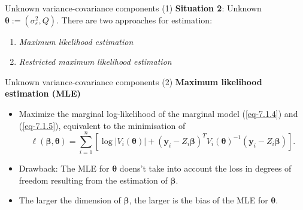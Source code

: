 \documentclass{beamer}
\newcommand{\boldbeta}{{\boldsymbol \beta}}
\newcommand{\boldtheta}{{\boldsymbol \theta}}
\newenvironment{wideitemize}%
  {\begin{itemize}%
    \setlength{\parskip}{1em}}%
  {\end{itemize}}
\begin{document}
\begin{frame}{Unknown variance-covariance components (1)}
\noindent \textbf{Situation 2}: Unknown  $\boldtheta:=(\sigma^2_\varepsilon, Q)$. There are two approaches for estimation:
\begin{enumerate}
\item \emph{Maximum likelihood estimation}
\item \emph{Restricted maximum likelihood estimation}
\end{enumerate}


 
\end{frame}


\begin{frame} {Unknown variance-covariance components (2)}
\noindent\textbf{Maximum likelihood estimation (MLE)}
\begin{wideitemize}
\item
Maximize the marginal log-likelihood of the marginal model (\ref{eq-7.1.4}) and (\ref{eq-7.1.5}), equivalent to the minimisation of
\[
\ell(\boldbeta, \boldtheta)=\sum_{i=1}^n\left[\log |V_i (\boldtheta)|+ (\mathbf{y}_i -
Z_i\boldbeta)^TV_i(\boldtheta)^{-1}(\mathbf{y}_i-Z_i \boldbeta)\right].
\]
\item
Drawback: The MLE for $\boldtheta$ doens't take into account the loss
in degrees of  freedom resulting from the estimation of $\boldbeta$.

\item  The larger the dimension of
$\boldbeta$, the larger is the bias of the MLE for $\boldtheta$.



\end{wideitemize}


\end{frame}
\end{document}
